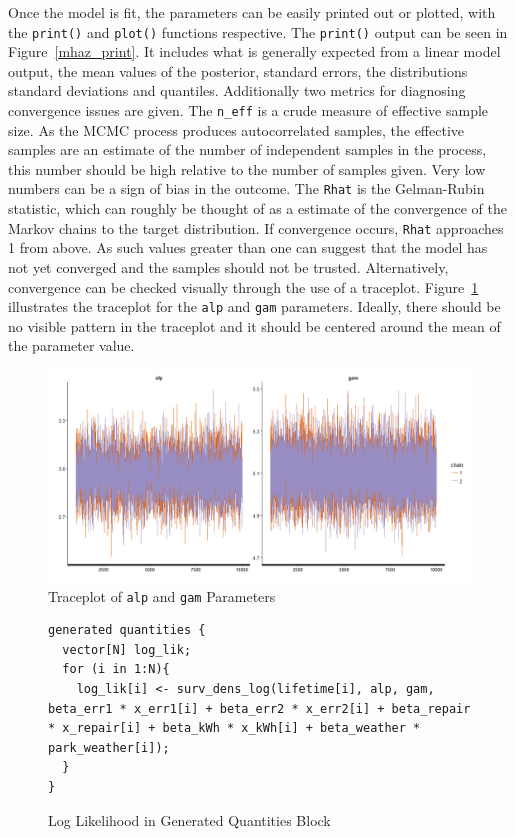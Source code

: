 Once the model is fit, the parameters can be easily printed out or plotted, with the \lstinline{print()} and \lstinline{plot()} functions respective. The \lstinline{print()} output can be seen in Figure~\ref{mhaz_print}. It includes what is generally expected from a linear model output, the mean values of the posterior, standard errors, the distributions standard deviations and quantiles. Additionally two metrics for diagnosing convergence issues are given. The \lstinline{n_eff} is a crude measure of effective sample size. As the MCMC process produces autocorrelated samples, the effective samples are an estimate of the number of independent samples in the process, this number should be high relative to the number of samples given. Very low numbers can be a sign of bias in the outcome. The \lstinline{Rhat} is the Gelman-Rubin statistic, which can roughly be thought of as a estimate of the convergence of the Markov chains to the target distribution\cite{Gelman1992}. If convergence occurs, \lstinline{Rhat} approaches 1 from above. As such values greater than one can suggest that the model has not yet converged and the samples should not be trusted. Alternatively, convergence can be checked visually through the use of a traceplot. Figure~\ref{mhaz_traceplot} illustrates the traceplot for the \lstinline{alp} and \lstinline{gam} parameters. Ideally, there should be no visible pattern in the traceplot and it should be centered around the mean of the parameter value. 

\begin{figure}[htbp]
    \centering
    \includegraphics[width=350pt]{img/mhaz_traceplot}
    \caption{Traceplot of \lstinline{alp} and \lstinline{gam} Parameters}
    \label{mhaz_traceplot}
\end{figure}






\begin{figure}[htbp]
    \centering
    \begin{lstlisting}[belowskip=-2 \baselineskip]
generated quantities {
  vector[N] log_lik;
  for (i in 1:N){
  	log_lik[i] <- surv_dens_log(lifetime[i], alp, gam, beta_err1 * x_err1[i] + beta_err2 * x_err2[i] + beta_repair * x_repair[i] + beta_kWh * x_kWh[i] + beta_weather * park_weather[i]);
  }
}\end{lstlisting}
    \caption{Log Likelihood in Generated Quantities Block}
    \label{mhaz_loglik}
\end{figure}



